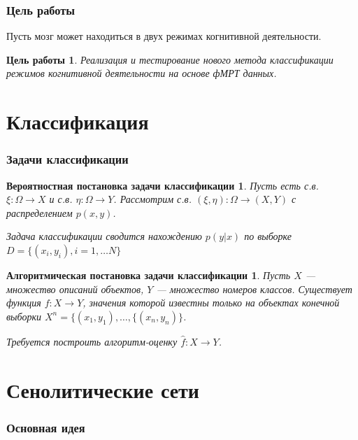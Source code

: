 \documentclass{beamer}
\newtheorem{target_}{Цель работы}
\newtheorem{prob_}{Вероятностная постановка задачи классификации}
\newtheorem{algo_}{Алгоритмическая постановка задачи классификации}
\begin{document}
	\begin{frame} 
		\frametitle{Цель работы}
		Пусть мозг может находиться в двух режимах когнитивной деятельности. 
		
		\begin{target_}
			Реализация и тестирование нового метода классификации режимов когнитивной деятельности на основе фМРТ данных.
		\end{target_}			
	\end{frame}

	\section{Классификация}
	\begin{frame} 
		\frametitle{Задачи классификации}
		\begin{prob_}
			Пусть есть с.в. $\xi: \Omega \rightarrow X$ и с.в. $\eta: \Omega \rightarrow Y$. Рассмотрим с.в. $(\xi, \eta): \Omega \rightarrow (X, Y)$ с распределением $p(x, y)$.
			\vspace{0.5cm}
			
			Задача классификации сводится нахождению $p(y|x)$ по выборке $D = \{(x_{i}, y_{i}), i = 1, \dots N\}$
		\end{prob_}
	
		\begin{algo_}
			Пусть $X$ --- множество описаний объектов, $Y$ --- множество номеров классов. Существует функция $f: X \rightarrow Y$, значения которой известны только на объектах конечной выборки $X^{n} = \{(x_{1}, y_{1}), \dots, \{(x_{n}, y_{n})\}$. 
			\vspace{0.5cm}
			
			Требуется построить алгоритм-оценку $\widehat{f}: X \rightarrow Y$.
		\end{algo_}
	\end{frame}
	
	\section{Сенолитические сети}
	\begin{frame} 
		\frametitle{Основная идея}
		
	\end{frame}
		
		
\end{document}
